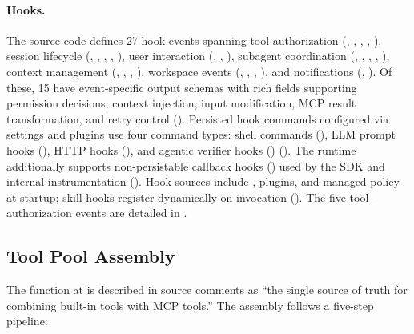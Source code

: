 \paragraph{Hooks.}
The source code defines 27 hook events spanning tool authorization (, , , , ), session lifecycle (, , , , ), user interaction (, , ), subagent coordination (, , , , ), context management (, , , ), workspace events (, , , ), and notifications (, ). Of these, 15 have event-specific output schemas with rich fields supporting permission decisions, context injection, input modification, MCP result transformation, and retry control (). Persisted hook commands configured via settings and plugins use four command types: shell commands (), LLM prompt hooks (), HTTP hooks (), and agentic verifier hooks () (). The runtime additionally supports non-persistable callback hooks () used by the SDK and internal instrumentation (). Hook sources include , plugins, and managed policy at startup; skill hooks register dynamically on invocation (). The five tool-authorization events are detailed in .

\subsection{Tool Pool Assembly}
\label{sec:ext:assembly}

The  function at  is described in source comments as ``the single source of truth for combining built-in tools with MCP tools.'' The assembly follows a five-step pipeline:

